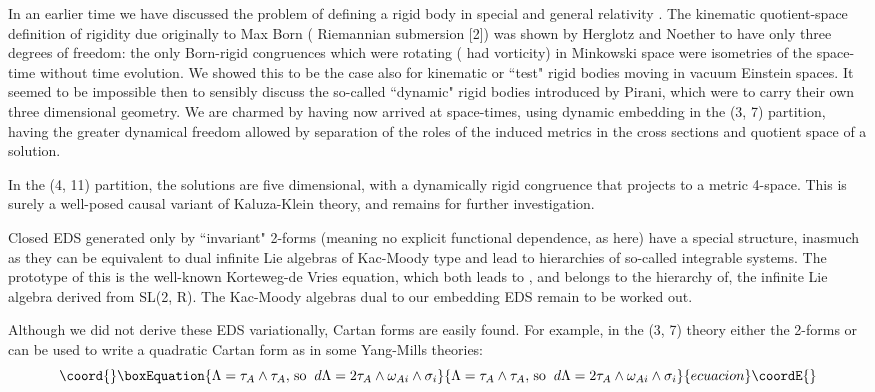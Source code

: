 \documentclass[a4paper,a4paper]{article}
\begin{document}
        In an earlier time we have discussed the problem of defining a
rigid body in special and general relativity \cite{wah66}.  The
kinematic quotient-space definition of rigidity due originally to Max Born (
Riemannian submersion [2]) was shown by Herglotz and Noether to have only 
three degrees  of freedom: the only Born-rigid congruences which were rotating (
had vorticity) in Minkowski space were isometries of the space-time without time
evolution.  We showed this to be the case also for kinematic or ``test" rigid bodies
moving in vacuum Einstein spaces.   It seemed to be impossible then to
sensibly discuss the so-called ``dynamic" rigid bodies introduced by Pirani,  which
were to carry their own three dimensional geometry. We are charmed by having
now arrived at  space-times,  using dynamic embedding in the (3, 7) partition,
having the greater dynamical freedom allowed by separation of the roles
of the induced metrics in the cross sections and quotient space of a solution.

        In the (4,  11) partition,  the solutions are five dimensional,
with a dynamically rigid congruence that projects to a metric
4-space.  This is
surely a well-posed causal variant of Kaluza-Klein theory,  and remains
for further investigation.

        Closed EDS generated only by ``invariant" 2-forms  (meaning no
explicit functional dependence,  as here) have a special structure,
inasmuch as they
can be equivalent to dual infinite Lie algebras of Kac-Moody type and
lead to hierarchies of so-called integrable systems.  The prototype of
this is the well-known Korteweg-de Vries equation,  which both leads to
\cite{est90},  and belongs to the hierarchy of,  the infinite Lie
algebra \coordHE{}derived from SL(2, R).   The Kac-Moody algebras 
dual to our embedding EDS remain to be worked out.

        Although we did not derive these EDS variationally,  Cartan
forms are easily found.  For example,  in the (3, 7) theory either the
2-forms \coordHE{} or \coordHE{} can be used to write a quadratic 
Cartan form as in some Yang-Mills theories:
\begin{equation}\coord{}\boxEquation{
\Lambda  = {{\tau }_A}\wedge {{\tau }_A},
\hspace{0.05cm}\mbox{so}\hspace{0.2cm} d{\Lambda } =
2 {{\tau }_A}\wedge {{\omega }_{{Ai}}}\wedge {{\sigma }_i}
}{
\Lambda  = {{\tau }_A}\wedge {{\tau }_A},
\hspace{0.05cm}\mbox{so}\hspace{0.2cm} d{\Lambda } =
2 {{\tau }_A}\wedge {{\omega }_{{Ai}}}\wedge {{\sigma }_i}
}{ecuacion}\coordE{}\end{equation}
\end{document}
